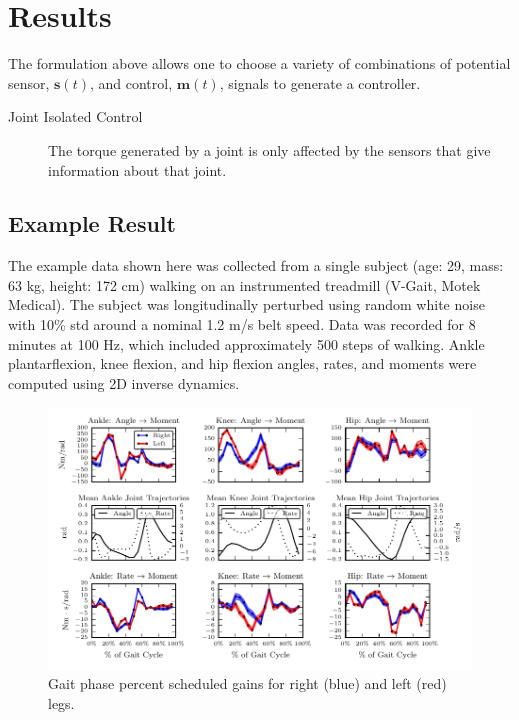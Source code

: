 \documentclass{article}
\begin{document}
\section*{Results}
%
The formulation above allows one to choose a variety of combinations of
potential sensor, $\mathbf{s}(t)$, and control, $\mathbf{m}(t)$, signals to
generate a controller.

\begin{description}
  \item[Joint Isolated Control] The torque generated by a joint is only
    affected by the sensors that give information about that joint.
\end{description}

\subsection*{Example Result}
%
The example data shown here was collected from a single subject (age: 29, mass:
63 kg, height: 172 cm) walking on an instrumented treadmill (V-Gait, Motek
Medical). The subject was longitudinally perturbed using random white noise
with 10\% std around a nominal 1.2 m/s belt speed. Data was recorded for 8
minutes at 100 Hz, which included approximately 500 steps of walking. Ankle
plantarflexion, knee flexion, and hip flexion angles, rates, and moments were
computed using 2D inverse dynamics.
%
\begin{figure}
  \begin{center}
    \includegraphics{figures/example-identified-joint-isolated-gains.pdf}
    \caption{Gait phase percent scheduled gains for right (blue) and left (red) legs.}
    \label{fig:example-gains}
  \end{center}
\end{figure}
\end{document}
